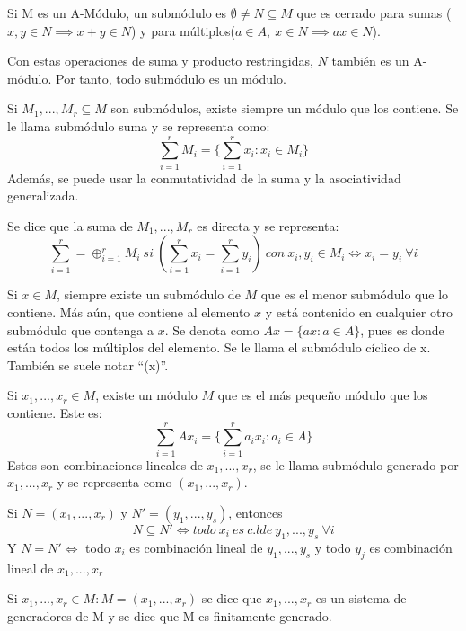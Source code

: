 \begin{ndef}[Submódulos]
	Si M es un A-Módulo, un submódulo es $\emptyset \ne N \subseteq M$ que es cerrado para sumas ($x,y\in N \implies x+y \in N$) y para múltiplos($a\in A,\ x\in N \implies ax\in N$).

	Con estas operaciones de suma y producto restringidas, $N$ también es un A-módulo. Por tanto, todo submódulo es un módulo.
\end{ndef}
\begin{nprop}
	Si $M_1,...,M_r \subseteq M$ son submódulos, existe siempre un módulo que los contiene. Se le llama submódulo suma y se representa como:
	\[
	\sum_{i=1}^r M_i =\{\sum_{i=1}^r x_i : x_i \in M_i\}
	\]
	Además, se puede usar la conmutatividad de la suma y la asociatividad generalizada.

\end{nprop}
\begin{ndef}
	Se dice que la suma de $M_1,...,M_r$ es directa y se representa:
	\[
	\sum_{i=1}^r = \oplus_{i=1}^r M_i \ si \ (\sum_{i=1}^r x_i =  \sum_{i=1}^r y_i) \ con \ x_i,y_i \in M_i \iff x_i = y_i\ \forall i	\]
\end{ndef}
\begin{ndef}
	Si $x\in M$, siempre existe un submódulo de $M$ que es el menor submódulo que lo contiene. Más aún, que contiene al elemento $x$ y está contenido en cualquier otro submódulo que contenga a $x$. Se denota como $Ax = \{ax : a \in A\}$, pues es donde están todos los múltiplos del elemento. Se le llama el submódulo cíclico de x. También se suele notar “(x)”.
\end{ndef}
\begin{ndef}
	Si $x_1,...,x_r \in M$, existe un módulo $M$ que es el más pequeño módulo que los contiene. Este es:
	\[
	\sum_{i=1}^r Ax_i = \{\sum_{i=1}^r a_ix_i : a_i \in A\}
	\]
	Estos son combinaciones lineales de $x_1,...,x_r$, se le llama submódulo generado por $x_1,...,x_r$ y se representa como $(x_1,...,x_r)$.
\end{ndef}
\begin{nota}
	Si $N=(x_1,...,x_r)$ y $N'= (y_1,...,y_s)$, entonces
	\[
	N \subseteq N' \iff todo\ x_i \ es \ c.l de \ y_1,...,y_s \ \forall i
	\]
	Y $N=N'\iff$ todo $x_i$ es combinación lineal de $y_1,...,y_s$ y todo $y_j$ es combinación lineal de $x_1,...,x_r$
\end{nota}
\begin{ndef}
	Si $x_1,...,x_r\in M : M = (x_1,...,x_r)$ se dice que $x_1,...,x_r$ es un sistema de generadores de M  y se dice que M es finitamente generado.
\end{ndef}
